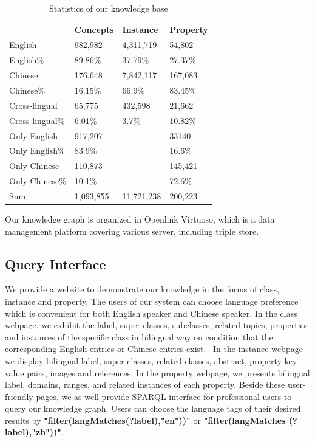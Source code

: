 \documentclass[runningheads,a4paper]{llncs}
\begin{document}
\begin{table}[h]
\small
\centering
\caption{Statistics of our knowledge base}
\label{tab:kb-result}
    \begin{tabular}{|l|l|l|l|}
        \hline
                        & Concepts  & Instance   & Property \\ \hline
        English         & 982,982   & 4,311,719  & 54,802   \\ \hline
        English\%       & 89.86\%   & 37.79\%    & 27.37\%  \\ \hline
        Chinese         & 176,648   & 7,842,117  & 167,083  \\ \hline
        Chinese\%       & 16.15\%   & 66.9\%     & 83.45\%  \\ \hline
        Cross-lingual   & 65,775    & 432,598    & 21,662   \\ \hline
        Cross-lingual\% & 6.01\%    & 3.7\%      & 10.82\%  \\ \hline
        Only English    & 917,207   &            & 33140    \\ \hline
        Only English\%  & 83.9\%    &            & 16.6\%   \\ \hline
        Only Chinese    & 110,873   &            & 145,421  \\ \hline
        Only Chinese\%  & 10.1\%    &            & 72.6\%   \\ \hline
        Sum             & 1,093,855 & 11,721,238 & 200,223  \\ \hline
    \end{tabular}
\end{table}

Our knowledge graph is organized in Openlink Virtuoso, which is a data management platform covering various server, including triple store.

\subsection{Query Interface}
We provide a website to demonstrate our knowledge in the forms of class, instance and property. The users of our system can choose language preference which is convenient for both English speaker and Chinese speaker. In the class webpage, we exhibit the label, super classes, subclasses, related topics, properties and instances of the specific class in bilingual way on condition that the corresponding English entries or Chinese entries exist.  In the instance webpage we display bilingual label, super classes, related classes, abstract, property key value pairs, images and references. In the property webpage, we presents bilingual label, domains, ranges, and related instances of each property. Beside these user-friendly pages, we as well provide SPARQL interface for professional users to query our knowledge graph. Users can choose the language tags of their desired results by \textbf{"filter(langMatches(?label),"en"))"} or \textbf{"filter(langMatches (?label),"zh"))"}.
\end{document}
